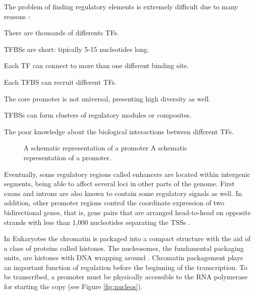 The problem of finding regulatory elements is extremely difficult due to many reasons \citep{fickett:1997a}:

\begin{mitemize}
\item
There are thousands of differents TFs.
\item
TFBSs are short: tipically 5-15 nucleotides long.
\item
Each TF can connect to more than one different binding site.
\item
Each TFBS can recruit different TFs.
\item
The core promoter is not universal, presenting high diversity as well.
\item
TFBSs can form clusters of regulatory modules or composites.
\item
The poor knowledge about the biological interactions between different TFs.
\end{mitemize}

\begin{figure}[t!]
\begin{center}
\setlength{\fboxsep}{0pt}
          {A schematic representation of a promoter}%
          {A schematic representation of a promoter.}%
          {}
\end{center}
\end{figure}

Eventually, some regulatory regions called enhancers  
are located within intergenic segments, being able to affect several loci in other parts of the genome. 
First exons and introns are also known to contain some regulatory signals as well.
In addition, other promoter regions control the coordinate expression of two bidirectional genes, 
that is, gene pairs that are arranged head-to-head on opposite strands with less than 1,000 nucleotides separating
the TSSs \citep{trinklein:2004a}.


In Eukaryotes the chromatin  
is packaged into a compact structure with the
aid of a class of proteins called histones. The nucleosomes,  
the fundamental packaging units, are histones  
with DNA wrapping around \citep{alberts:1994a}.
Chromatin packagement plays an important function of regulation before the
beginning of the transcription. To be transcribed, a promoter must be
physically accessible to the RNA polymerase for starting the copy (see 
Figure \ref{fig:nucleos}).

